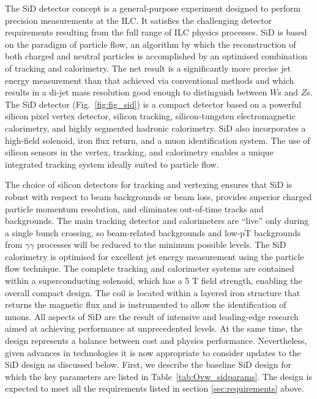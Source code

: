 The SiD detector concept is a general-purpose experiment designed to perform
 precision measurements
at the ILC. It satisfies the challenging detector requirements resulting from the full range of 
ILC physics processes. SiD is based on the paradigm of particle flow, an algorithm by which
the reconstruction of both charged and neutral particles is accomplished by an optimised
combination of tracking and calorimetry. The net result is a significantly more precise jet
energy measurement than that achieved via conventional methods and which results in a di-jet mass resolution good enough to distinguish
between $W$s and $Z$s.
The SiD detector (Fig.~\ref{fig:fig_sid})  is a compact detector based on a powerful silicon
pixel vertex detector, silicon tracking, silicon-tungsten electromagnetic calorimetry, and
highly segmented hadronic calorimetry. 
SiD also incorporates a high-field solenoid, iron
flux return, and a muon identification system. The use of silicon 
sensors in the vertex, tracking,
and calorimetry enables a unique integrated tracking system ideally suited to particle
flow.

The choice of silicon detectors for tracking and vertexing ensures that SiD is robust
with respect to beam backgrounds or beam loss, provides superior charged particle momentum
resolution, and eliminates out-of-time tracks and backgrounds. The main tracking
detector and calorimeters are “live” only during a single bunch crossing, so beam-related
backgrounds and low-pT backgrounds from $\gamma\gamma$ processes will be reduced to the minimum
possible levels. The SiD calorimetry is optimised for excellent jet energy measurement
using the particle flow technique.
 The complete tracking and calorimeter systems are contained
within a superconducting solenoid, which has a 5 T field strength, enabling the overall
compact design. The coil is located within a layered iron structure
that returns the magnetic flux and is instrumented to allow the
identification of muons. 
All aspects of SiD are the result of intensive and leading-edge research aimed at achieving
performance at unprecedented levels. At the same time, the design represents a balance between cost
and physics performance. Nevertheless, given advances in technologies it is now appropriate to consider updates to the SiD design as discussed below. First, we describe the baseline SiD design for which the key parameters are
listed in  
Table~\ref{tab:Ovw_sidparams}.
%
The design is expected to meet all the requirements listed in section \ref{sec:requirements} above.

